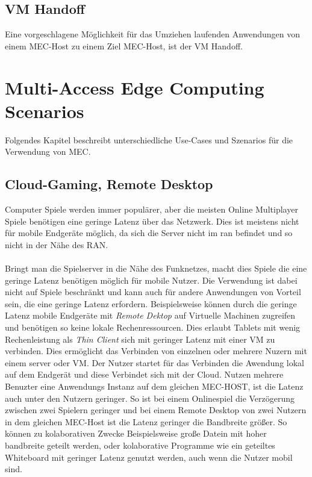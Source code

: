 \documentclass[runningheads]{llncs}
\numberwithin{figure}{section}
\begin{document}
\subsection{VM Handoff}
Eine vorgeschlagene Möglichkeit \cite{etsiETSIGSMEC} für das Umziehen laufenden Anwendungen von einem MEC-Host zu einem Ziel MEC-Host, 
ist der VM Handoff. \cite{Ha2015AdaptiveVH}
\newpage

\section{Multi-Access Edge Computing Scenarios}
\label{sec:Anwendungen}
Folgendes Kapitel beschreibt unterschiedliche Use-Cases und Szenarios für die Verwendung von MEC.\cite{patelContributorHuaweiVice}
\subsection{Cloud-Gaming, Remote Desktop}
\label{subsec:Cloud-Gaming}
Computer Spiele werden immer populärer, aber die meisten Online Multiplayer Spiele benötigen eine geringe 
Latenz über das Netzwerk. Dies ist meistens nicht für mobile Endgeräte möglich, da sich die Server nicht im \acrshort{ran} befindet und so
nicht in der Nähe des RAN.
\\
\\
Bringt man die Spielserver in die Nähe des Funknetzes, macht dies Spiele die eine geringe Latenz benötigen
möglich für mobile Nutzer. 
Die Verwendung ist dabei nicht auf Spiele beschränkt und kann auch für andere Anwendungen von Vorteil sein, 
die eine geringe Latenz erfordern. Beispielsweise können durch die geringe Latenz mobile Endgeräte mit \textit{Remote Dektop} auf
Virtuelle Machinen zugreifen und benötigen so keine lokale Rechenressourcen. Dies erlaubt Tablets mit wenig Rechenleistung als 
\textit{Thin Client} sich mit geringer Latenz mit einer VM zu verbinden.
Dies ermöglicht das Verbinden von einzelnen oder mehrere Nuzern mit einem server oder VM. Der Nutzer startet für das Verbinden
die Awendung lokal auf dem Endgerät und diese Verbindet sich mit der Cloud. Nutzen mehrere Benuzter eine Anwendungs Instanz auf dem 
gleichen MEC-HOST, ist die Latenz auch unter den Nutzern geringer. So ist bei einem Onlinespiel die Verzögerung zwischen zwei Spielern
geringer und bei einem Remote Desktop von zwei Nutzern in dem gleichen MEC-Host ist die Latenz geringer die Bandbreite größer. 
So können zu kolaborativen Zwecke Beispielsweise große Datein mit hoher bandbreite geteilt werden, oder kolaborative Programme wie
ein geteiltes Whiteboard mit geringer Latenz genutzt werden, auch wenn die Nutzer mobil sind.
\end{document}
